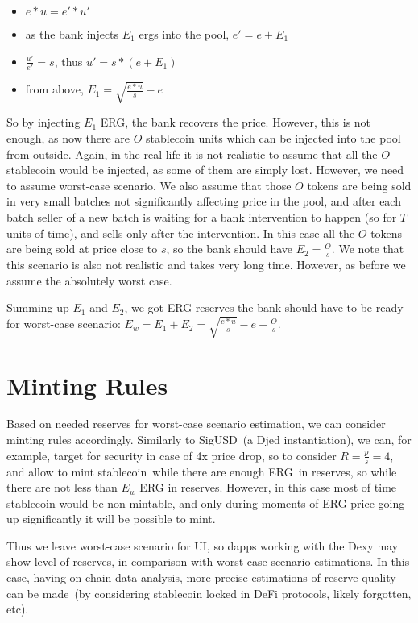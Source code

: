 \documentclass{article}   %
\newcommand{\bc}{ERG}
\newcommand{\sct}{stablecoin}
\newcommand{\dx}{Dexy}
\begin{document}
\begin{itemize}
  \item{} $e * u = e' * u'$
  \item{} as the bank injects $E_1$ ergs into the pool, $e' = e + E_1$
  \item{} $\frac{u'}{e'} = s$, thus $u' = s * (e + E_1)$ 
  \item{} from above, $E_1 = \sqrt{\frac{e * u}{s}} - e$
\end{itemize}

So by injecting $E_1$ \bc{}, the bank recovers the price. However, this is not enough, as now there are $O$ \sct{} units which can be injected into the pool from outside. 
Again, in the real life it is not realistic to assume that all the $O$ \sct{} would be injected, as some of them are simply lost. However, we need to assume worst-case scenario. We also assume that those $O$ tokens are being sold in very small batches not significantly affecting price in the pool, and after each batch seller of a new batch is waiting for a bank intervention to happen (so for $T$ units of time), and sells only after the intervention. In this case all the $O$ tokens are being sold at price close to $s$, so the bank should have $E_2 = \frac{O}{s}$. We note that this scenario is also not realistic and takes very long time. However, as before we assume the absolutely worst case.

Summing up $E_1$ and $E_2$, we got \bc{} reserves the bank should have to be ready for worst-case scenario: $E_w = E_1 + E_2 = \sqrt{\frac{e * u}{s}} - e + \frac{O}{s}$.

\section{Minting Rules}

Based on needed reserves for worst-case scenario estimation, we can consider minting rules accordingly. Similarly to SigUSD~(a Djed instantiation), we can, for example, target for security in case of 
4x price drop, so to consider $R = \frac{p}{s} = 4$, and allow to mint \sct{}~while there are enough \bc{}~in reserves, so while there are not less than $E_w$ \bc{} in reserves. However, in this case most of time \sct{} would be non-mintable, and only during moments of \bc{} price going up significantly it will be possible to mint. 

Thus we leave worst-case scenario for UI, so dapps working with the \dx{} may show level of reserves, in comparison with worst-case scenario estimations. In this case, having on-chain data analysis, 
more precise estimations of reserve quality can be made~(by considering \sct{} locked in DeFi protocols, likely forgotten, etc).
\end{document}
